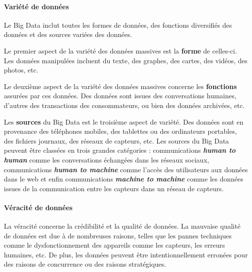 		\paragraph{Variété de données} \label{variete-data}
		
		Le Big Data inclut toutes les formes de données, des fonctions diversifiés des données et des sources variées des données.
		
		Le premier aspect de la variété  des données massives est la \textbf{forme} de celles-ci. Les données manipulées incluent du texte, des graphes, des cartes, des vidéos, des photos, etc.
		
		Le deuxième aspect de la variété des données massives concerne les \textbf{fonctions} assurées par ces données. Des données sont issues des conversations humaines, d'autres des transactions des consommateurs, ou bien des données archivées, etc.
		
		Les \textbf{sources} du Big Data est le troisième aspect de  variété. Des données sont en provenance des téléphones mobiles, des tablettes ou des ordinateurs portables, des fichiers journaux, des réseaux de capteurs, etc. Les sources du Big Data peuvent être classées en trois grandes catégories : communications \textbf{\textit{human to human}} comme les conversations échangées dans les réseaux sociaux, communications \textbf{\textit{ human to machine}} comme l'accès des utilisateurs aux données dans le web et enfin communications \textbf{\textit{machine to machine}} comme les données issues de la communication entre les capteurs dans un réseau de capteurs.
		\paragraph{Véracité de données}
		
		La véracité concerne la crédibilité et la qualité de données. La mauvaise qualité de données est due à de nombreuses raisons, telles que les pannes techniques comme le dysfonctionnement des appareils comme les capteurs, les erreurs humaines,  etc. De plus, les données peuvent être intentionnellement erronées pour des raisons de concurrence ou des raisons stratégiques.
	
